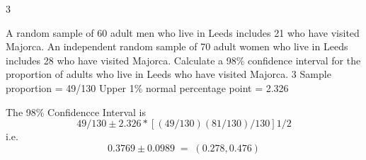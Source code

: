 \documentclass[a4paper,12pt]{article}
\begin{document}
3

A random sample of 60 adult men who live in Leeds includes 21 who have visited Majorca. An independent random sample of 70 adult women who live in Leeds includes 28 who have visited Majorca.
Calculate a 98\% confidence interval for the proportion of adults who live in Leeds
who have visited Majorca.
3
Sample proportion = 49/130
Upper 1\% normal percentage point = 2.326

The 98\% Confidencce Interval is
\[49/130 \pm 2.326*[(49/130)(81/130)/130] 1/2\] i.e. \[0.3769 \pm 0.0989 \;=\; (0.278, 0.476)\]

\end{document}
